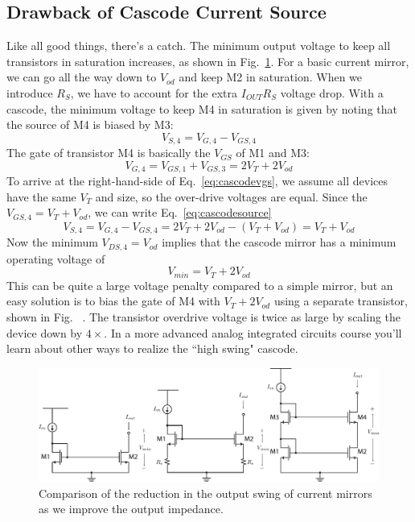  

\subsection{Drawback of Cascode Current Source}

Like all good things, there's a catch.  The minimum output voltage to keep all transistors in saturation increases, as shown in Fig.~\ref{fig:mirrors_vmin}.  For a basic current mirror, we can go all the way down to $V_{od}$ and keep M2 in saturation.  When we introduce $R_S$, we have to account for the extra $I_{OUT} R_S$ voltage drop.  With a cascode, the minimum voltage to keep M4 in saturation is given by noting that the source of M4 is biased by M3:
%
\begin{equation}
	V_{S,4} = V_{G,4} - V_{GS,4}   \label{eq:cascodesource}
\end{equation}
%
The gate of transistor M4 is basically the $V_{GS}$ of M1 and M3:
%
\begin{equation}
	V_{G,4} = V_{GS,1} + V_{GS,3} = 2 V_T + 2 V_{od}   \label{eq:cascodevgs}
\end{equation}
%
To arrive at the right-hand-side of Eq.~\ref{eq:cascodevgs}, we assume all devices have the same $V_T$ and size, so the over-drive voltages are equal.  Since the $V_{GS,4} = V_T + V_{od}$, we can write Eq.~\ref{eq:cascodesource}
%
\begin{equation}
	V_{S,4} = V_{G,4} - V_{GS,4}   = 2 V_T + 2 V_{od} - ( V_T + V_{od} ) = V_T + V_{od}
\end{equation}
%
Now the minimum $V_{DS,4} = V_{od}$ implies that the cascode mirror has a minimum operating voltage of
%
\begin{equation}
	V_{min} = V_T + 2 V_{od}
\end{equation}
%
This can be quite a large voltage penalty compared to a simple mirror, but an easy solution is to bias the gate of M4 with $V_T + 2 V_{od}$ using a separate transistor, shown in Fig.~ \label{fig:cascode_hiswing}.  The transistor overdrive voltage is twice as large by scaling the device down by $4\times$.  In a more advanced analog integrated circuits course you'll learn about other ways to realize the ``high swing" cascode.
 


\begin{figure}[tb]
\begin{center}
\includegraphics[width=\columnwidth]{mirrors_vmin}
\end{center}
\caption{Comparison of the reduction in the output swing of current mirrors as we improve the output impedance.} \label{fig:mirrors_vmin}
\end{figure}





